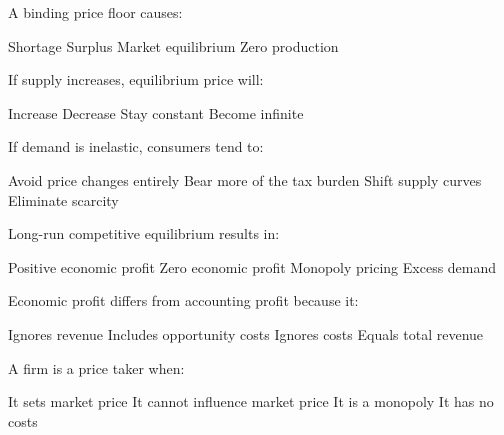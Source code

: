 \documentclass[12pt]{exam}
\begin{document}
\begin{questions}
    \begin{mcquestion}[2]
        A binding price floor causes:
        \begin{choices}
            \choice Shortage
            \CorrectChoice Surplus
            \choice Market equilibrium
            \choice Zero production
        \end{choices}
    \end{mcquestion}

    \begin{mcquestion}[2]
        If supply increases, equilibrium price will:
        \begin{choices}
            \choice Increase
            \CorrectChoice Decrease
            \choice Stay constant
            \choice Become infinite
        \end{choices}
    \end{mcquestion}

    \begin{mcquestion}[2]
        If demand is inelastic, consumers tend to:
        \begin{choices}
            \choice Avoid price changes entirely
            \CorrectChoice Bear more of the tax burden
            \choice Shift supply curves
            \choice Eliminate scarcity
        \end{choices}
    \end{mcquestion}

    \begin{mcquestion}[2]
        Long-run competitive equilibrium results in:
        \begin{choices}
            \choice Positive economic profit
            \CorrectChoice Zero economic profit
            \choice Monopoly pricing
            \choice Excess demand
        \end{choices}
    \end{mcquestion}

    \begin{mcquestion}[2]
        Economic profit differs from accounting profit because it:
        \begin{choices}
            \choice Ignores revenue
            \CorrectChoice Includes opportunity costs
            \choice Ignores costs
            \choice Equals total revenue
        \end{choices}
    \end{mcquestion}

    \begin{mcquestion}[2]
        A firm is a price taker when:
        \begin{choices}
            \choice It sets market price
            \CorrectChoice It cannot influence market price
            \choice It is a monopoly
            \choice It has no costs
        \end{choices}
    \end{mcquestion}


\end{questions}
\end{document}

